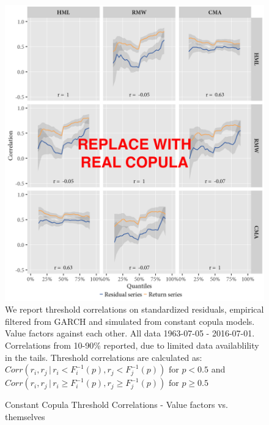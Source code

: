 \begin{figure}[H]
  \caption{Constant Copula Threshold Correlations - Value factors vs. themselves}
  \label{diag:thresholdvalue_copula}
  \centering
  \begin{minipage}{\textwidth}
  \includegraphics[scale=1]{graphics/threshold_Value_copula.png}  
  \vspace{3mm}
  \footnotesize
  We report threshold correlations on standardized residuals, empirical filtered from GARCH and simulated from constant copula models. Value factors against each other. All data 1963-07-05 - 2016-07-01. Correlations from 10-90\% reported, due to limited data availablility in the tails. Threshold correlations are calculated as: $Corr(r_i, r_j \,|\, r_i < F_i^{-1}(p), r_j < F_j^{-1}(p)) \text{ for } p < 0.5$ and $Corr(r_i, r_j \,|\, r_i \geq F_i^{-1}(p), r_j \geq F_j^{-1}(p)) \text{ for } p \geq 0.5$ 
  \end{minipage}
\end{figure}

